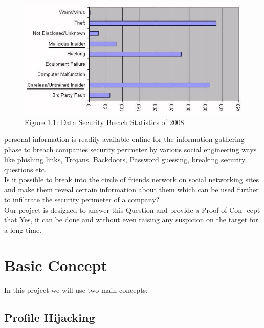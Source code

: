 \begin{figure}[htb]

\centering
\includegraphics[scale=0.6]{project/figdata}
\caption{Figure 1.1: Data Security Breach Statistics of 2008}
\label{fig:data} %
\end{figure}

personal information is readily available online for the information gathering
phase to breach companies security perimeter by various social engineering
ways like phishing links, Trojans, Backdoors, Password guessing, breaking
security questions etc.\\[0.5cm]
Is it possible to break into the circle of friends network on social networking
sites and make them reveal certain information about them which can be
used further to infiltrate the security perimeter of a company?\\[0.5cm]
Our project is designed to answer this Question and provide a Proof of Con-
cept that Yes, it can be done and without even raising any suspicion on the
target for a long time.



\section{Basic Concept}
In this project we will use two main concepts:

\subsection{Profile Hijacking}

